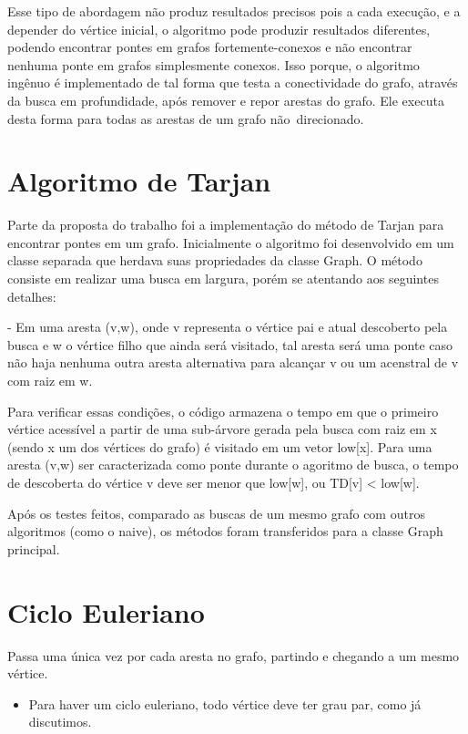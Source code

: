 Esse tipo de abordagem não produz resultados precisos pois a cada execução, e a depender do vértice inicial, o algoritmo pode produzir resultados 
diferentes, podendo encontrar pontes em grafos fortemente-conexos e não encontrar nenhuma ponte em grafos simplesmente conexos. Isso porque, o algoritmo 
ingênuo é implementado de tal forma que testa a conectividade do grafo, através da busca em profundidade, após remover e repor arestas do grafo. Ele 
executa desta forma para todas as arestas de um grafo não direcionado.

\section{Algoritmo de Tarjan}

Parte da proposta do trabalho foi a implementação do método de Tarjan para encontrar pontes em um grafo.
Inicialmente o algoritmo foi desenvolvido em um classe separada que herdava suas propriedades da classe Graph. O método consiste em realizar uma busca em 
largura, porém se atentando aos seguintes detalhes:

- Em uma aresta (v,w), onde v representa o vértice pai e atual descoberto pela busca e w o vértice filho que ainda será visitado, tal aresta será uma 
ponte caso não haja nenhuma outra aresta alternativa para alcançar v ou um acenstral de v com raiz em w.

Para verificar essas condições, o código armazena o tempo em que o primeiro vértice acessível a partir de uma sub-árvore gerada pela busca com raiz em x 
(sendo x um dos vértices do grafo) é visitado em um vetor low[x]. Para uma aresta (v,w) ser caracterizada como ponte durante o agoritmo de busca, o tempo 
de descoberta do vértice v deve ser menor que low[w], ou TD[v] < low[w].

Após os testes feitos, comparado as buscas de um mesmo grafo com outros algoritmos (como o naive), os métodos foram transferidos para a classe Graph 
principal.

\section{Ciclo Euleriano}

Passa uma única vez por cada aresta no grafo, partindo e chegando a um mesmo vértice.

\begin{itemize}
	\item Para haver um ciclo euleriano, todo vértice deve ter grau par, como já discutimos.
\end{itemize}

